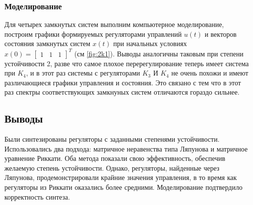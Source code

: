 \subsubsection{Моделирование}

Для четырех замкнутых систем выполним компьютерное моделирование,
построим графики формируемых регуляторами управлений $u(t)$ и векторов
состояния замкнутых систем $x(t)$ при начальных условиях $x(0) =\begin{bmatrix}
    1&1&1
\end{bmatrix}^T$ (см \autoref{fig:2k1}). Выводы аналогичны таковым при степени
устойчивости 2, разве что самое плохое перерегулирование теперь имеет система при
$K_4$, и в этот раз системы с регуляторами $K_3$ И $K_4$
не очень похожи и имеют различающиеся графики управления и состояния. Это 
связано с тем что в этот раз спектры соответствующих замкнуных систем отличаются
гораздо сильнее.


\subsection{Выводы}

Были синтезированы регуляторы с заданными степенями устойчивости. 
Использовались два подхода: матричное неравенства типа Ляпунова и 
матричное уравнение Риккати. Оба метода показали свою эффективность, обеспечив желаемую 
степень устойчивости. Однако, регуляторы, найденные через Ляпунова, продемонстрировали 
крайние значения управления, в то время как регуляторы из Риккати оказались более 
средними. Моделирование подтвердило корректность синтеза.


